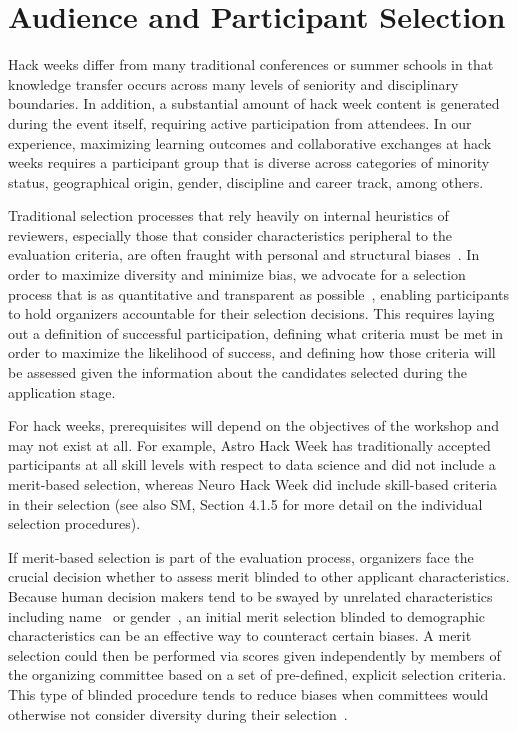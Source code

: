 \section*{Audience and Participant Selection}

Hack weeks differ from many traditional conferences or summer schools in that knowledge transfer occurs across many levels of seniority and disciplinary boundaries.
In addition, a substantial amount of hack week content is generated during the event itself, requiring active participation from attendees.
In our experience, maximizing learning outcomes and collaborative exchanges at hack weeks requires a participant group that is diverse across categories of minority status, geographical origin, gender, discipline and career track, among others.

Traditional selection processes that rely heavily on internal heuristics of reviewers, especially those that consider characteristics peripheral to the evaluation criteria, are often fraught with personal and structural biases~\cite[e.g.][]{sunstein2015wiser}.
In order to maximize diversity and minimize bias, we advocate for a selection process that is as quantitative and transparent as possible~\cite{sunstein2015wiser}, enabling participants to hold organizers accountable for their selection decisions.
This requires laying out a definition of successful participation, defining what criteria must be met in order to maximize the likelihood of success, and defining how those criteria will be assessed given the information about the candidates selected during the application stage.

For hack weeks, prerequisites will depend on the objectives of the workshop and may not exist at all. For example, Astro Hack Week has traditionally accepted participants at all skill levels with respect to data science and did not include a merit-based selection, whereas Neuro Hack Week did include skill-based criteria in their selection (see also SM, Section 4.1.5 for more detail on the individual selection procedures).

If merit-based selection is part of the evaluation process, organizers face the crucial decision whether to assess merit blinded to other applicant characteristics. Because human decision makers tend to be swayed by unrelated characteristics including name~\cite{bertrand2004} or gender~\cite{mossracusin2012}, an initial merit selection blinded to demographic characteristics can be an effective way to counteract certain biases. A merit selection could then be performed via scores given independently by members of the organizing committee based on a set of pre-defined, explicit selection criteria. This type of blinded procedure tends to reduce biases when committees would otherwise not consider diversity during their selection~\cite{bohnet2016}.

